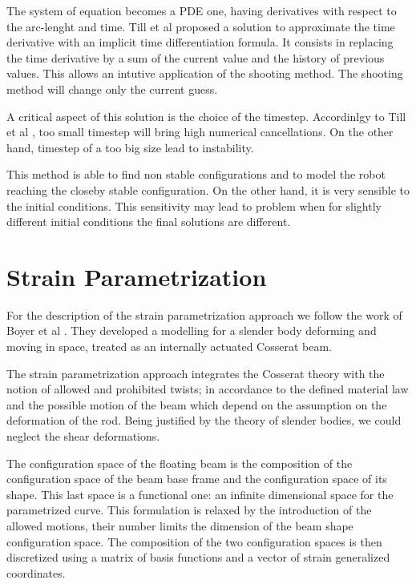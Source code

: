\documentclass{thesisreport}
\begin{document}
 The system of equation becomes a PDE one, having derivatives with respect to the arc-lenght and time. Till et al \cite{till_real-time_2019} proposed a solution to approximate the time derivative with an implicit time differentiation formula. It consists in replacing the time derivative by a sum of the current value and the history of previous values. This allows an intutive application of the shooting method. The shooting method will change only the current guess. 
 
 A critical aspect of this solution is the choice of the timestep. Accordinlgy to Till et al \cite{till_real-time_2019}, too small timestep will bring high numerical cancellations. On the other hand, timestep of a too big size lead to instability. 
 
 This method is able to find non stable configurations and to model the robot reaching the closeby stable configuration. On the other hand, it is very sensible to the initial conditions. This sensitivity may lead to problem when for slightly different initial conditions the final solutions are different. 
 
 
 \section{Strain Parametrization}
 
 For the description of the strain parametrization approach we follow the work of Boyer et al \cite{boyer_dynamics_2019}. They developed a modelling for a slender body deforming and moving in space, treated as an internally actuated Cosserat beam.
 
 The strain parametrization approach integrates the Cosserat theory with the notion of allowed and prohibited twists; in accordance to the defined material law and the possible motion of the beam which depend on the assumption on the deformation of the rod. Being justified by the theory of slender bodies, we could neglect the shear deformations.
 
 The configuration space of the floating beam is the composition of the configuration space of the beam base frame and the configuration space of its shape. This last space is a functional one: an infinite dimensional space for the parametrized curve. 
 This formulation is relaxed by the introduction of the allowed motions, their number limits the dimension of the beam shape configuration space. 
 The composition of the two configuration spaces is then discretized using a matrix of basis functions and a vector of strain generalized coordinates. 
 
\end{document}
